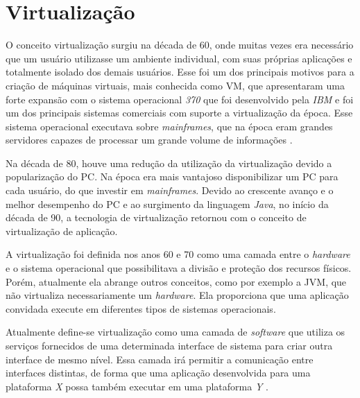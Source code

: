 \chapter{Virtualização}
\label{cap:virtualizacao}

O conceito virtualização surgiu na década de 60, onde muitas vezes era necessário que um usuário utilizasse um ambiente individual, 
com suas próprias aplicações e totalmente isolado dos demais usuários. Esse foi um dos principais motivos para a criação de máquinas 
virtuais, mais conhecida como \ac{VM}, que apresentaram uma forte expansão com o sistema operacional \textit{370} que foi desenvolvido 
pela \textit{IBM} e foi um dos principais sistemas comerciais com suporte a virtualização da época. Esse sistema operacional executava 
sobre \textit{mainframes}, que na época eram grandes servidores capazes de processar um grande volume de informações \cite{laureano2008}. 

Na década de 80, houve uma redução da utilização da virtualização devido a popularização do \ac{PC}. Na época era mais vantajoso disponibilizar 
um \ac{PC} para cada usuário, do que investir em \textit{mainframes}. Devido ao crescente avanço e o melhor desempenho do \ac{PC} e
ao surgimento da linguagem \textit{Java}, no início da década de 90, a tecnologia de virtualização retornou com o conceito de virtualização
de aplicação.

A virtualização foi definida nos anos 60 e 70 como uma camada entre o \textit{hardware} e o sistema operacional que possibilitava a 
divisão e proteção dos recursos físicos. Porém, atualmente ela abrange outros conceitos, como por exemplo a \ac{JVM}, que não virtualiza
necessariamente um \textit{hardware}. Ela proporciona que uma aplicação convidada execute em diferentes tipos de sistemas operacionais.

Atualmente define-se virtualização como uma camada de \textit{software} que utiliza os serviços fornecidos de uma determinada interface de 
sistema para criar outra interface de mesmo nível. Essa camada irá permitir a comunicação entre interfaces distintas, de forma que uma 
aplicação desenvolvida para uma plataforma \textit{X} possa também executar em uma plataforma \textit{Y} \cite{laureano2008}.

